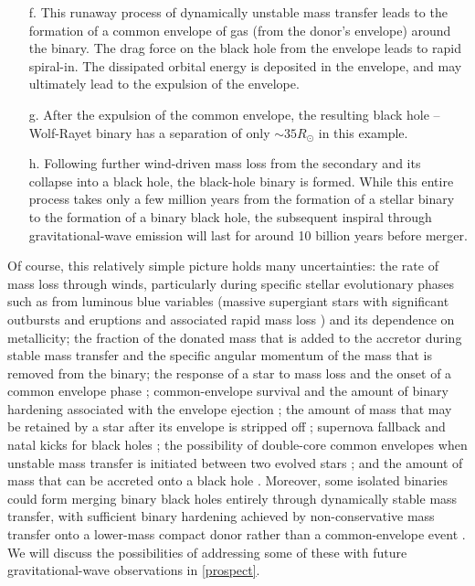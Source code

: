 \documentclass[review]{elsarticle}
\begin{document}
\begin{enumerate}
\item[f.] This runaway process of dynamically unstable mass transfer leads to the formation of a common envelope of gas (from the donor's envelope) around the binary.  The drag force on the black hole from the envelope leads to rapid spiral-in.   The dissipated orbital energy is deposited in the envelope, and may ultimately lead to the expulsion of the envelope.  
\item[g.] After the expulsion of the common envelope, the resulting black hole -- Wolf-Rayet binary has a separation of only $\sim 35 R_\odot$ in this example.  
\item[h.] Following further wind-driven mass loss from the secondary and its collapse into a black hole, the black-hole binary is formed.  While this entire process takes only a few million years from the formation of a stellar binary to the formation of a binary black hole, the subsequent inspiral through gravitational-wave emission will last for around 10 billion years before merger.
\end{enumerate}

Of course, this relatively simple picture holds many uncertainties: the rate of mass loss through winds, particularly during specific stellar evolutionary phases such as from luminous blue variables (massive supergiant stars with significant outbursts and eruptions and associated rapid mass loss \citep{Vink:2011})  and its dependence on metallicity; the fraction of the donated mass that is added to the accretor during stable mass transfer \citep{KippenhahnMeyerHofmeister:1977} and the specific angular momentum of the mass that is removed from the binary; the response of a star to mass loss and the onset of a common envelope phase \citep{Pavlovskii:2017}; common-envelope survival and the amount of binary hardening associated with the envelope ejection \citep[e.g.,][]{Kruckow:2016,Klencki:2020convective,Fragos:2019,LawSmith:2020,Lau:2021}; the amount of mass that may be retained by a star after its envelope is stripped off \citep[e.g.,][]{Laplace:2020}; supernova fallback and natal kicks for black holes \citep[e.g.,][]{Fryer:2012,Repetto:2012,Mandel:2015kicks,Mueller:2020}; the possibility of double-core common envelopes when unstable mass transfer is initiated between two evolved stars \citep{BetheBrown:1998,Belczynski:2002,Dewi:2006}; and the amount of mass that can be accreted onto a black hole \citep{Eldridge:2017,Bavera:2020,vanSon:2020}.  Moreover, some isolated binaries could form merging binary black holes entirely through dynamically stable mass transfer, with sufficient binary hardening achieved by non-conservative mass transfer onto a lower-mass compact donor rather than a common-envelope event \citep{vandenHeuvel:2017,Pavlovskii:2017,Neijssel:2018,vanSon:2021}.  We will discuss the possibilities of addressing some of these with future gravitational-wave observations in \autoref{prospect}.
\end{document}
